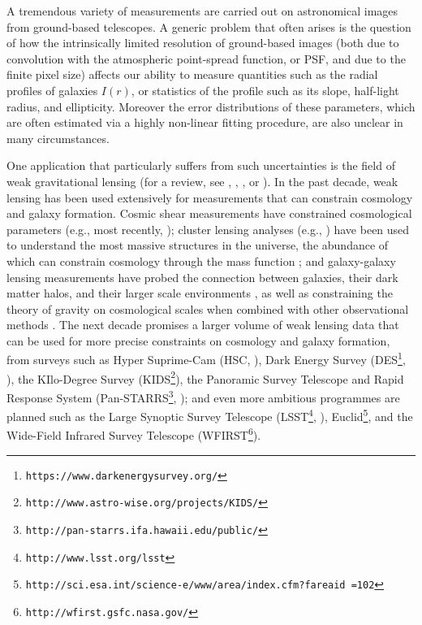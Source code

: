 \documentclass[twocolumn,useAMS,usenatbib]{mn2e}
\begin{document}
A tremendous variety of measurements are carried out on astronomical
images from ground-based telescopes.  A generic problem that often
arises is the question of how the intrinsically limited resolution of
ground-based images (both due to convolution with the atmospheric
point-spread function, or PSF, and due to the finite pixel size)
affects our ability to measure quantities such as the radial profiles
of galaxies $I(r)$, or statistics of the profile such as its slope,
half-light radius, and ellipticity.  Moreover the error distributions
of these parameters, which are often estimated via a highly non-linear
fitting procedure, are also unclear in many circumstances.

One application that particularly suffers from such uncertainties is
the field of weak gravitational lensing (for a review, see
\citealt{2001PhR...340..291B}, \citealt{2003ARA&A..41..645R},
\citealt{2008ARNPS..58...99H}, or \citealt{2010RPPh...73h6901M}).  In
the past decade, weak lensing has been used extensively for
measurements that can constrain cosmology and galaxy formation.
Cosmic shear measurements have constrained cosmological parameters
(e.g., most recently,
\citealt{2008A&A...479....9F,2010A&A...516A..63S}); cluster lensing
analyses (e.g., \citealt{2007MNRAS.379..317H,2010PASJ...62..811O})
have been used to understand the most massive structures in the
universe, the abundance of which can constrain cosmology through the
mass function \citep[e.g., ][]{2007ApJ...657..183R,2008MNRAS.387.1179M,2009ApJ...692.1060V,2010ApJ...708..645R};
and galaxy-galaxy lensing measurements have probed the connection
between galaxies, their dark matter halos, and their larger scale
environments \citep{2010MNRAS.408.1463S,2011arXiv1104.0928L}, as well
as constraining the theory of gravity on cosmological scales when
combined with other observational methods \citep{2010Natur.464..256R}.
The next decade promises a larger volume of weak lensing data that can
be used for more precise constraints on cosmology and galaxy
formation, from surveys such as Hyper Suprime-Cam 
(HSC, \citealt{2006SPIE.6269E...9M}),
Dark Energy Survey (DES\footnote{\texttt{https://www.darkenergysurvey.org/}}, \citealt{2005astro.ph.10346T}),
the KIlo-Degree Survey (KIDS\footnote{\texttt{http://www.astro-wise.org/projects/KIDS/}}),
the Panoramic Survey Telescope and Rapid Response System
(Pan-STARRS\footnote{\texttt{http://pan-starrs.ifa.hawaii.edu/public/}}, 
\citealt{2010SPIE.7733E..12K}); and even more ambitious programmes are planned such as
the Large Synoptic Survey Telescope
(LSST\footnote{\texttt{http://www.lsst.org/lsst}}, \citealt{2009arXiv0912.0201L}),
Euclid\footnote{\texttt{http://sci.esa.int/science-e/www/area/index.cfm?fareaid\
    =102}}, and the Wide-Field Infrared Survey Telescope 
(WFIRST\footnote{\texttt{http://wfirst.gsfc.nasa.gov/}}).
\end{document}
